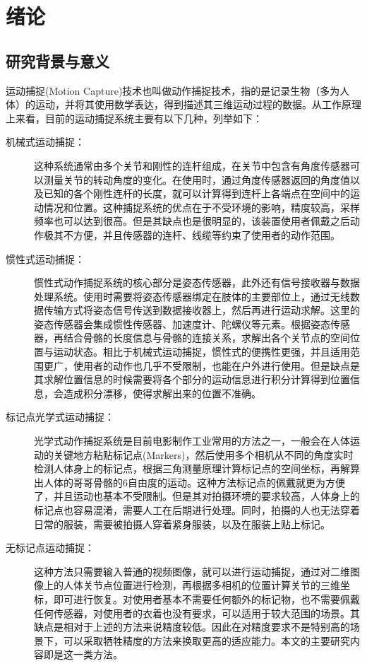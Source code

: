 
\section{绪论}

\subsection{研究背景与意义}
运动捕捉(Motion Capture)技术也叫做动作捕捉技术，指的是记录生物（多为人体）的运动，并将其使用数学表达，得到描述其三维运动过程的数据。从工作原理上来看，目前的运动捕捉系统主要有以下几种，列举如下：
\begin{description}
    \item[机械式运动捕捉：]这种系统通常由多个关节和刚性的连杆组成，在关节中包含有角度传感器可以测量关节的转动角度的变化。在使用时，通过角度传感器返回的角度值以及已知的各个刚性连杆的长度，就可以计算得到连杆上各端点在空间中的运动情况和位置。这种捕捉系统的优点在于不受环境的影响，精度较高，采样频率也可以达到很高。但是其缺点也是很明显的，该装置使用者佩戴之后动作极其不方便，并且传感器的连杆、线缆等约束了使用者的动作范围。
    \item[惯性式运动捕捉：]惯性式动作捕捉系统的核心部分是姿态传感器，此外还有信号接收器与数据处理系统。使用时需要将姿态传感器绑定在肢体的主要部位上，通过无线数据传输方式将姿态信号传送到数据接收器上，然后再进行运动求解。这里的姿态传感器会集成惯性传感器、加速度计、陀螺仪等元素。根据姿态传感器，再结合骨骼的长度信息与骨骼的连接关系，求解出各个关节点的空间位置与运动状态。相比于机械式运动捕捉，惯性式的便携性更强，并且适用范围更广，使用者的动作也几乎不受限制，也能在户外进行使用。但是缺点是其求解位置信息的时候需要将各个部分的运动信息进行积分计算得到位置信息，会造成积分漂移，使得求解出来的位置不准确。
    \item[标记点光学式运动捕捉：]光学式动作捕捉系统是目前电影制作工业常用的方法之一，一般会在人体运动的关键地方粘贴标记点(Markers)，然后使用多个相机从不同的角度实时检测人体身上的标记点，根据三角测量原理计算标记点的空间坐标，再解算出人体的哥哥骨骼的6自由度的运动。这种方法标记点的佩戴就更为方便了，并且运动也基本不受限制。但是其对拍摄环境的要求较高，人体身上的标记点也容易混淆，需要人工在后期进行处理。同时，拍摄的人也无法穿着日常的服装，需要被拍摄人穿着紧身服装，以及在服装上贴上标记。
    \item[无标记点运动捕捉：]这种方法只需要输入普通的视频图像，就可以进行运动捕捉，通过对二维图像上的人体关节点位置进行检测，再根据多相机的位置计算关节的三维坐标，即可进行恢复。对使用者基本不需要任何额外的标记物，也不需要佩戴任何传感器，对使用者的衣着也没有要求，可以适用于较大范围的场景。其缺点是相对于上述的方法来说精度较低。因此在对精度要求不是特别高的场景下，可以采取牺牲精度的方法来换取更高的适应能力。本文的主要研究内容即是这一类方法。
\end{description}

